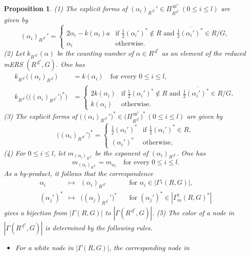 \documentclass[11pt]{amsart}
\newcommand{\dc}{\,\underline{\mathrm{d}}^c}
\newcommand{\mc}{\, \underline{\mathrm{m}}^c}
\newtheorem{prop}[thm]{Proposition}%
\begin{document}
{\begin{prop}\label{prop:Gamma(R',G)}
{\rm (1)} The explicit forms of $(\alpha_i)_{R^{\dc}}'\in \Pi^{\mc}_{R^{\dc}}\, (0\leq i\leq l)$ are 
given by
\[(\alpha_i)_{R^{\dc}}'=\begin{cases}
2\alpha_i-k(\alpha_i)a & \text{if $\frac12 (\alpha_i')^\ast\not\in R$ and 
$\frac12 \overline{(\alpha_i')^\ast}\in R/G$},\\
\alpha_i & \text{otherwise}.
\end{cases}\]
{\rm (2)} Let $k_{R^{\dc}}(\alpha)$ be the counting number of 
$\alpha\in R^{\dc}$ as an element of the reduced mERS $(R^{\dc},G)$. One has
\[\begin{aligned}
k_{R^{\dc}}\big((\alpha_i)_{R^{\dc}}\big)&=k(\alpha_i)\quad\text{for every }0\leq i\leq l, \\
k_{R^{\dc}}\big(\big((\alpha_i)_{R^{\dc}}'\big)^\ast\big)&=\begin{cases}
2k(\alpha_i) & \text{if $\frac12 (\alpha_i')^\ast\not\in R$ and 
$\frac12 \overline{(\alpha_i')^\ast}\in R/G$},\\
k(\alpha_i) & \text{otherwise}.
\end{cases}
\end{aligned}\]
{\rm (3)} The explicit forms of $\big((\alpha_i)_{R^{\dc}}'\big)^\ast\in 
\big(\Pi^{\mc}_{R^{\dc}}\big)^\ast\, (0\leq i\leq l)$ are given by
\[\big((\alpha_i)_{R^{\dc}}'\big)^\ast=\begin{cases}
\frac12 (\alpha_i')^\ast & \text{if $\frac12 (\alpha_i')^\ast\in R$},\\
(\alpha_i')^\ast & \text{otherwise},
\end{cases} \]
{\rm (4)} For $0\leq i\leq l$, let $m_{(\alpha_i)_{R^{\dc}}}$ be the exponent of 
$(\alpha_i)_{R^{\dc}}$. One has
\[m_{(\alpha_i)_{R^{\dc}}}=m_{\alpha_i}\quad \text{for every }0\leq i\leq l.\]
As a by-product, it follows that the correspondence
\[\begin{array}{lllllllll}
\alpha_i & \longmapsto &  (\alpha_i)_{R^{\dc}}\quad &\text{for }\alpha_i\in|\Gamma^{\downarrow}(R,G)|,
\\[5pt]
(\alpha_j')^\ast & \longmapsto & \big((\alpha_j)_{R^{\dc}}'\big)^\ast \quad &\text{for }
(\alpha_j')^\ast\in |\Gamma_m^{\uparrow}(R,G)^\ast|
\end{array}\]
gives a bijection from $|\Gamma(R,G)|$ to $|\Gamma(R^{\dc},G)|$.
\vskip 1mm
\noindent
{\rm (5)} The color of a node in $|\Gamma(R^{\dc},G)|$ is determined by the following 
rules. 
\begin{itemize}
\item For a white node in $|\Gamma(R,G)|$, the corresponding node in 

\end{itemize}
\end{prop}}
\end{document}
